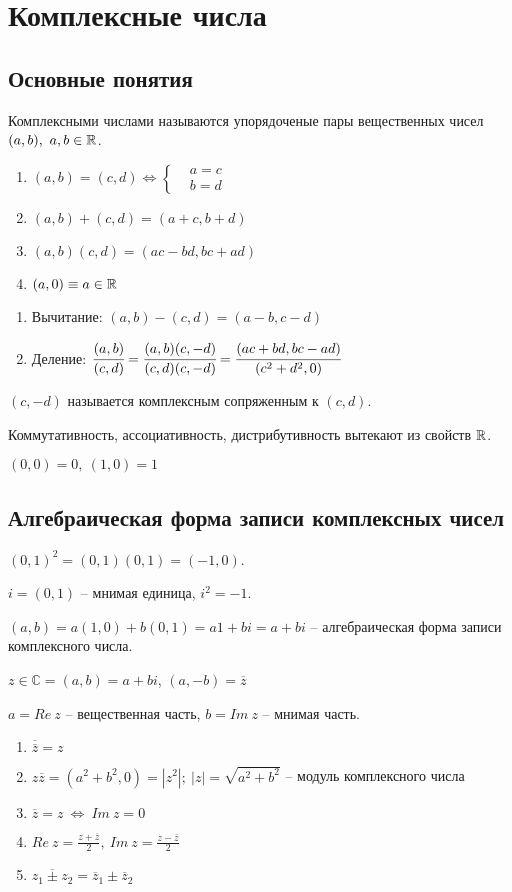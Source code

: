 \chapter{Комплексные числа}
\section{Основные понятия}
\begin{opred}
Комплексными числами называются упорядоченые пары вещественных чисел $(a,b),\ a,b\in\mathbb{R}$.
\end{opred}
\begin{enumerate}
\item $(a,b)=(c,d)\Leftrightarrow\left\{\begin{matrix}&a=c\\&b=d\end{matrix}\right.$
\item $(a,b)+(c,d)=(a+c,b+d)$
\item $(a,b)(c,d)=(ac-bd,bc+ad)$
\item $(a,0)\equiv a\in\mathbb{R}$
\end{enumerate}
\begin{enumerate}
\item Вычитание: $(a,b)-(c,d)=(a-b,c-d)$
\item Деление: $\cfrac{(a,b)}{(c,d)}=\cfrac{(a,b)(c,-d)}{(c,d)(c,-d)}=\cfrac{(ac+bd,bc-ad)}{(c^2+d^2,0)}$
\end{enumerate}

$(c,-d)$ называется комплексным сопряженным к $(c,d)$.

Коммутативность, ассоциативность, дистрибутивность вытекают из свойств $\mathbb{R}$.


$(0,0)=0,\ (1,0)=1$
\section{Алгебраическая форма записи комплексных чисел}
$(0,1)^2=(0,1)(0,1)=(-1,0)$.

$i=(0,1)$ -- мнимая единица, $i^2=-1$.

$(a,b)=a(1,0)+b(0,1)=a1+bi=a+bi$ -- алгебраическая форма записи комплексного числа.

$z\in\mathbb{C}=(a,b)=a+bi$, $(a,-b)=\overline{z}$

$a=Re\ z$ -- вещественная часть, $b=Im\ z$ -- мнимая часть.
\begin{enumerate}
\item $\overline{\overline{z}}=z$
\item $z\overline{z}=(a^2+b^2,0)=|z^2|;\ |z|=\sqrt{a^2+b^2}$ -- модуль комплексного числа
\item $\overline{z}=z\ \Leftrightarrow\ Im\ z=0$
\item $Re\ z=\frac{z+\overline{z}}2,\ Im\ z=\frac{z-\overline{z}}2$
\item $\overline{z_1\pm z_2}=\overline{z}_1\pm\overline{z}_2$
\end{enumerate}
